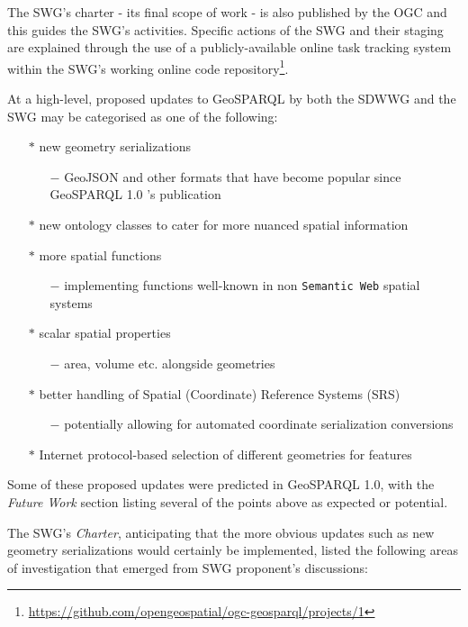 \documentclass[runningheads]{llncs}
\begin{document}
The SWG's charter - its final scope of work - is also published by the OGC \cite{abhayaratna2020ogc} and this guides 
the SWG's activities. Specific actions of the SWG and their staging are explained through the use of a publicly-available 
online task tracking system within the SWG's working online code repository\footnote{\url{https://github.com/opengeospatial/ogc-geosparql/projects/1}}.

At a high-level, proposed updates to GeoSPARQL by both the SDWWG and the SWG may be categorised as one of the following:

\begin{itemize}
    \item[$\ast$] new geometry serializations
    \begin{itemize}
        \item[$-$] GeoJSON and other formats that have become popular since GeoSPARQL 1.0 's publication
    \end{itemize} 
    \item[$\ast$] new ontology classes to cater for more nuanced spatial information
    \item[$\ast$] more spatial functions
    \begin{itemize}
        \item[$-$] implementing functions well-known in non \texttt{Semantic Web} spatial systems
    \end{itemize} 
    \item[$\ast$] scalar spatial properties 
    \begin{itemize}
        \item[$-$] area, volume etc. alongside geometries
    \end{itemize} 
    \item[$\ast$] better handling of Spatial (Coordinate) Reference Systems (SRS)
    \begin{itemize}
        \item[$-$] potentially allowing for automated coordinate serialization conversions
    \end{itemize} 
    \item[$\ast$] Internet protocol-based selection of different geometries for features
\end{itemize}

Some of these proposed updates were predicted in GeoSPARQL 1.0, with the \textit{Future Work} section listing several of the 
points above as expected or potential.

The SWG's \textit{Charter}, anticipating that the more obvious updates such as new geometry serializations would certainly
be implemented, listed the following areas of investigation that emerged from SWG proponent's discussions:
\end{document}
